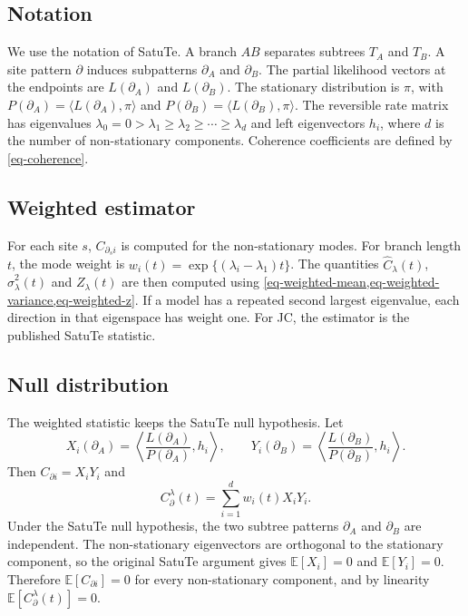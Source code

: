 \subsection*{Notation}

We use the notation of SatuTe. A branch \(AB\) separates subtrees \(T_A\) and \(T_B\). A site pattern \(\partial\) induces subpatterns \(\partial_A\) and \(\partial_B\). The partial likelihood vectors at the endpoints are \(L(\partial_A)\) and \(L(\partial_B)\). The stationary distribution is \(\pi\), with \(P(\partial_A)=\langle L(\partial_A),\pi\rangle\) and \(P(\partial_B)=\langle L(\partial_B),\pi\rangle\). The reversible rate matrix has eigenvalues \(\lambda_0=0>\lambda_1\geq\lambda_2\geq\cdots\geq\lambda_d\) and left eigenvectors \(h_i\), where \(d\) is the number of non-stationary components. Coherence coefficients are defined by \cref{eq-coherence}.

\subsection*{Weighted estimator}

For each site \(s\), \(C_{\partial_s i}\) is computed for the non-stationary modes. For branch length \(t\), the mode weight is \(w_i(t)=\exp\{(\lambda_i-\lambda_1)t\}\). The quantities \(\hat C_{\lambda}(t)\), \(\hat\sigma_{\lambda}^{2}(t)\) and \(Z_{\lambda}(t)\) are then computed using \cref{eq-weighted-mean,eq-weighted-variance,eq-weighted-z}. If a model has a repeated second largest eigenvalue, each direction in that eigenspace has weight one. For JC, the estimator is the published SatuTe statistic.

\subsection*{Null distribution}

The weighted statistic keeps the SatuTe null hypothesis. Let
\[
X_i(\partial_A)=\left\langle \frac{L(\partial_A)}{P(\partial_A)},h_i\right\rangle,
\qquad
Y_i(\partial_B)=\left\langle \frac{L(\partial_B)}{P(\partial_B)},h_i\right\rangle .
\]
Then \(C_{\partial i}=X_iY_i\) and
\[
C_{\partial}^{\lambda}(t)=\sum_{i=1}^{d}w_i(t)X_iY_i .
\]
Under the SatuTe null hypothesis, the two subtree patterns \(\partial_A\) and \(\partial_B\) are independent. The non-stationary eigenvectors are orthogonal to the stationary component, so the original SatuTe argument gives \(\mathbb{E}[X_i]=0\) and \(\mathbb{E}[Y_i]=0\). Therefore \(\mathbb{E}[C_{\partial i}]=0\) for every non-stationary component, and by linearity \(\mathbb{E}[C_{\partial}^{\lambda}(t)]=0\).

